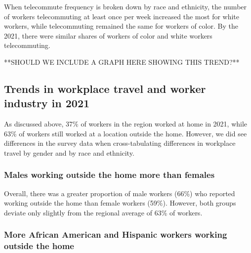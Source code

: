 \documentclass[
  12pt,
]{article}
\begin{document}
\begin{flushleft}
When telecommute frequency is broken down by race and ethnicity, the number of workers telecommuting at least once per week increased the most for white workers, while telecommuting remained the same for workers of color. By the 2021, there were similar shares of workers of color and white workers telecommuting.

**SHOULD WE INCLUDE A GRAPH HERE SHOWING THIS TREND?**

\end{flushleft}

\hypertarget{trends-in-workplace-travel-and-worker-industry-in-2021}{%
\subsection{Trends in workplace travel and worker industry in
2021}\label{trends-in-workplace-travel-and-worker-industry-in-2021}}

\begin{flushleft}
As discussed above, 37\% of workers in the region worked at home in 2021, while 63\% of workers still worked at a location outside the home. However, we did see differences in the survey data when cross-tabulating differences in workplace travel by gender and by race and ethnicity.
\end{flushleft}

\hypertarget{males-working-outside-the-home-more-than-females}{%
\subsubsection{Males working outside the home more than
females}\label{males-working-outside-the-home-more-than-females}}

\begin{flushleft}
Overall, there was a greater proportion of male workers (66\%) who reported working outside the home than female workers (59\%). However, both groups deviate only slightly from the regional average of 63\% of workers.
\end{flushleft}

\hypertarget{more-african-american-and-hispanic-workers-working-outside-the-home}{%
\subsubsection{More African American and Hispanic workers working
outside the
home}\label{more-african-american-and-hispanic-workers-working-outside-the-home}}
\end{document}
